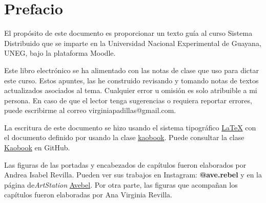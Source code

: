 \setchapterpreamble[u]{\margintoc}

\chapter{Prefacio}  
 
 El propósito de este documento es  proporcionar un texto gu\'ia al  curso Sistema Distribuido que se imparte en la Universidad Nacional Experimental de Guayana, UNEG, bajo la plataforma Moodle.
 
Este libro electrónico se ha alimentado con las notas  de clase que uso para dictar este curso. Estos apuntes, las he construido revisando y tomando notas de textos actualizados asociados al tema.  Cualquier error u omisión es solo atribuible a mi persona. En caso de que el lector tenga sugerencias o requiera reportar errores, puede escribirme al correo  virginiapadillas@gmail.com.
 

La escritura de este documento se hizo usando  el sistema  tipogr\'afico   \href{https://www.latex-project.org/}{\LaTeX{}} con el documento definido por \href{https://sourceforge.net/projects/koma-script/}{\KOMAScript}   usando la clase \href{https://github.com/fmarotta/kaobook/}{kaobook}. 
Puede consultar la clase    \href{ https://github.com/fmarotta/kaobook} {Kaobook} en GitHub.

Las figuras de las portadas y  encabezados de  capítulos fueron elaborados por Andrea Isabel Revilla.  Pueden ver sus trabajos en  Instagram: \textbf{@ave.rebel}  y en la p\'agina de\textit \textit{ArtStation} \href{https://linktr.ee/avebel}{Avebel}. 
 Por otra parte, las figuras que acompa\~nan los cap\'itulos fueron elaboradas por Ana Virginia Revilla. 

